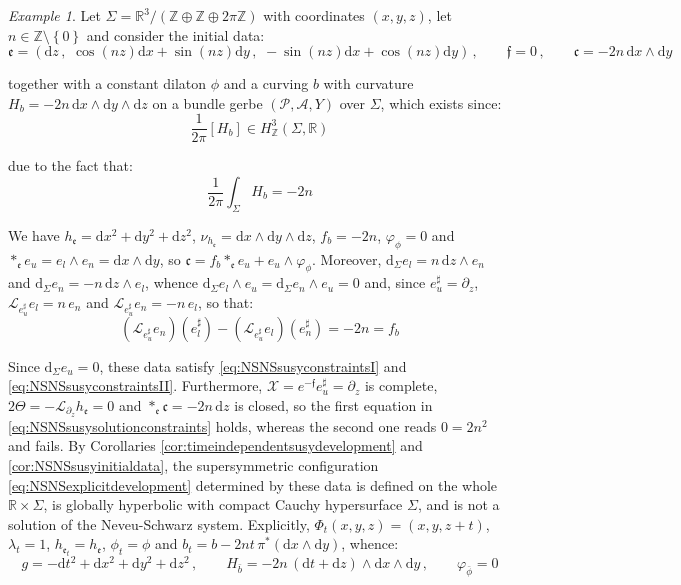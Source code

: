 \documentclass[10pt,reqno,a4paper]{amsart}
\theoremstyle{plain}
\theoremstyle{definition}
\theoremstyle{remark}
\theoremstyle{remark}
\newtheorem{ep}[thm]{Example}
\def\dd{\mathrm{d}}
\def\cA{\mathcal{A}}
\def\cP{\mathcal{P}}
\def\cL{\mathcal{L}}
\def\cX{\mathcal{X}}
\def\frc{\mathfrak{c}}
\def\cL{\mathcal{L}}
\def\fre{\mathfrak{e}}
\renewcommand{\(}{ (}
\renewcommand{\)}{ )}
\newcommand{\frf}{\mathfrak{f}}
\begin{document}
\begin{ep}
\label{ep:compactremainingscalar}
Let $\Sigma = \mathbb{R}^3/(\mathbb{Z}\oplus\mathbb{Z}\oplus 2\pi\mathbb{Z})$ with coordinates $(x,y,z)$, let $n\in\mathbb{Z}\setminus\left\{ 0\right\}$ and consider the initial data:
\begin{equation*}
\fre =  ( \dd z\, , \,\, \cos(nz)\dd x + \sin(nz)\dd y\, , \,\, -\sin(nz)\dd x + \cos(nz)\dd y )\, , \qquad \frf = 0\, , \qquad \frc = -2n\, \dd x\wedge\dd y
\end{equation*}

\noindent
together with a constant dilaton $\phi$ and a curving $b$ with curvature $H_b = -2n\, \dd x\wedge\dd y\wedge\dd z$ on a bundle gerbe $(\cP,\cA,Y)$ over $\Sigma$, which exists since:
\begin{equation*}
\frac{1}{2\pi}[H_b]\in H^3_{\mathbb{Z}}(\Sigma,\mathbb{R})    
\end{equation*}

\noindent
due to the fact that:
\begin{equation*}
 \frac{1}{2\pi}\int_{\Sigma}H_b = -2n   
\end{equation*}

\noindent
We have $h_{\fre} = \dd x^2 + \dd y^2 + \dd z^2$, $\nu_{h_{\fre}} = \dd x\wedge\dd y\wedge\dd z$, $f_b = -2n$, $\varphi_{\phi} = 0$ and $\ast_{\fre}e_u = e_l\wedge e_n = \dd x\wedge\dd y$, so $\frc = f_b\ast_{\fre}e_u + e_u\wedge\varphi_{\phi}$. Moreover, $\dd_{\Sigma}e_l = n\, \dd z\wedge e_n$ and $\dd_{\Sigma}e_n = -n\, \dd z\wedge e_l$, whence $\dd_{\Sigma}e_l\wedge e_u = \dd_{\Sigma}e_n\wedge e_u = 0$ and, since $e^{\sharp}_u = \partial_z$, $\cL_{e^{\sharp}_u}e_l = n\, e_n$ and $\cL_{e^{\sharp}_u}e_n = -n\, e_l$, so that:
\begin{equation*}
 (\cL_{e^{\sharp}_u}e_n)(e^{\sharp}_l) - (\cL_{e^{\sharp}_u}e_l)(e^{\sharp}_n) = -2n = f_b   
\end{equation*}

\noindent
Since $\dd_{\Sigma}e_u = 0$, these data satisfy \eqref{eq:NSNSsusyconstraintsI} and \eqref{eq:NSNSsusyconstraintsII}. Furthermore, $\cX = e^{-\frf}e^{\sharp}_u = \partial_z$ is complete, $2 \Theta = - \cL_{\partial_z}h_{\fre} = 0$ and $\ast_{\fre}\frc = -2n\, \dd z$ is closed, so the first equation in \eqref{eq:NSNSsusysolutionconstraints} holds, whereas the second one reads $0 = 2n^2$ and fails. By Corollaries \ref{cor:timeindependentsusydevelopment} and \ref{cor:NSNSsusyinitialdata}, the supersymmetric configuration \eqref{eq:NSNSexplicitdevelopment} determined by these data is defined on the whole $\mathbb{R}\times\Sigma$, is globally hyperbolic with compact Cauchy hypersurface $\Sigma$, and is not a solution of the Neveu-Schwarz system. Explicitly, $\Phi_t(x,y,z) = (x,y,z+t)$, $\lambda_t = 1$, $h_{\fre_t} = h_{\fre}$, $\phi_t = \phi$ and $b_t = b - 2nt\, \pi^{\ast}(\dd x\wedge\dd y)$, whence:
\begin{equation*}
g = -\dd t^2 + \dd x^2 + \dd y^2 + \dd z^2\, , \qquad H_{\bar{b}} = -2n\, (\dd t + \dd z)\wedge\dd x\wedge\dd y\, , \qquad \varphi_{\bar{\phi}} = 0
\end{equation*}


\end{ep}
\end{document}
